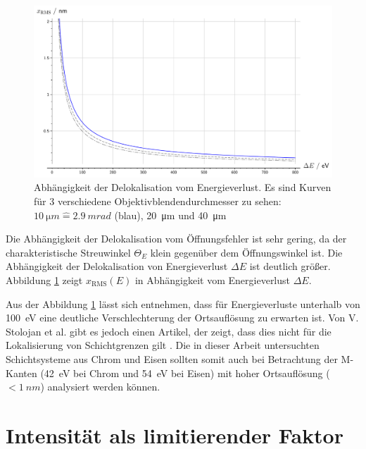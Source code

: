 \documentclass[
	paper=a4,				%
	twoside=true,			%
	BCOR=6mm,				%
	fontsize=12pt,			%
	pagesize=auto,			%
	numbers=noenddot,		%
	bibliography=totoc,		%
	draft=false
]{scrartcl}
\begin{document}
\begin{figure}
	\centering
	\includegraphics[width=1\linewidth]{../../Jupyter-Notebooks/AnhangC/Bilder/delta_TM_loss}
	\caption{Abhängigkeit der Delokalisation vom Energieverlust. Es sind Kurven für 3 verschiedene Objektivblendendurchmesser zu sehen: $\SI{10}{\micro m} \mathrel{\hat=} \SI{2,9}{mrad}$ (blau), \SI{20}{\micro m} und \SI{40}{\micro m}}
	\label{fig:delta_TM_loss}
\end{figure}

Die Abhängigkeit der Delokalisation vom Öffnungsfehler ist sehr gering, da der charakteristische Streuwinkel $\Theta_E$ klein gegenüber dem Öffnungswinkel ist. Die Abhängigkeit der Delokalisation von Energieverlust $\Delta E$ ist deutlich größer. Abbildung \ref{fig:delta_TM_loss} zeigt $x_\mathrm{RMS}(E)$ in Abhängigkeit vom Energieverlust $\Delta E$.

Aus der Abbildung \ref{fig:delta_TM_loss} lässt sich entnehmen, dass für Energieverluste unterhalb von \SI{100}{eV} eine deutliche Verschlechterung der Ortsauflösung zu erwarten ist. Von V. Stolojan et al. gibt es jedoch einen Artikel, der zeigt, dass dies nicht für die Lokalisierung von Schichtgrenzen gilt \cite{stolojan_energy_2006}. Die in dieser Arbeit untersuchten Schichtsysteme aus Chrom und Eisen sollten somit auch bei Betrachtung der M-Kanten (\SI{42}{eV} bei Chrom und \SI{54}{eV} bei Eisen) mit hoher Ortsauflösung ($<\SI{1}{nm}$) analysiert werden können.

\section{Intensität als limitierender Faktor}
\end{document}
